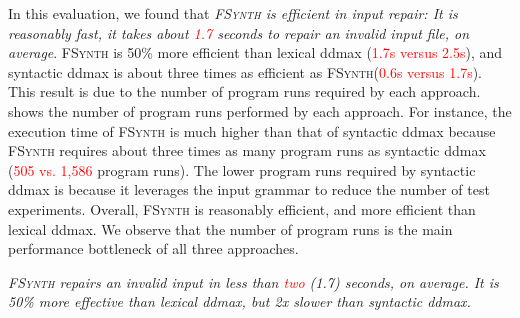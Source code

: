 \documentclass[sigconf,review,anonymous]{acmart}
\newenvironment{result}{\begin{framed}\centering\it}{\end{framed}}
\newcommand{\recheck}[1]{\textcolor{red}{#1}}
\newcommand{\approach}{\textsc{FSynth}\xspace}
\begin{document}
In this evaluation, we found that \textit{\approach is efficient in input repair: It is reasonably fast, it takes about \recheck{1.7} seconds to repair an invalid input file, on average}.
\approach is 50\% more efficient than lexical ddmax (\recheck{1.7s versus 2.5s}), and syntactic ddmax is about three times as efficient as \approach (\recheck{0.6s versus 1.7s}).
This result is %
due to the %
number of program runs required by each approach.
shows %
the number of %
program runs performed by each approach. %
For instance, the execution time
of \approach %
is much higher %
than that of syntactic ddmax
because \approach requires about three times as many program runs as syntactic ddmax (\recheck{505 vs. 1,586} program runs).
The lower program runs required by syntactic ddmax is because %
it leverages the input grammar to reduce the number of test experiments.
Overall, %
\approach is reasonably efficient, and %
more efficient than lexical ddmax. %
We observe that the number of program runs is the main performance bottleneck of all three approaches. %

\begin{result}
\approach %
repairs an invalid input in less than \recheck{two} (1.7) seconds, on average. %
It is 50\% more effective than lexical ddmax, but 2x slower than syntactic ddmax.
\end{result}
\end{document}
